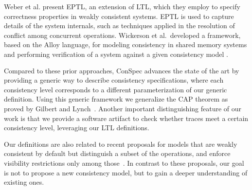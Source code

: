 \documentclass[journal, compsoc]{IEEEtran}
\begin{document}
	Weber et al. \cite{Weber2017} present EPTL, an extension of LTL,  which they employ to specify correctness properties in weakly consistent systems. EPTL is used to capture  details of the system internals, such as techniques applied in the resolution of conflict among concurrent operations. Wickerson et al.\ developed a framework, based on the Alloy language, for modeling consistency in shared memory systems and performing verification of a system against a given consistency model  \cite{Wickerson:2017:ACM:3009837.3009838}.
	
	
	Compared to these prior approaches, ConSpec advances the state of the art by providing a generic way to describe consistency specifications, where each consistency level corresponds to a different parameterization of our generic definition.  Using this generic framework we generalize the CAP theorem as proved by Gilbert and Lynch~\cite{Gilbert:2002:BCF:564585.564601}. Another important distinguishing feature of our work is that we provide a software artifact to check whether traces meet a certain consistency level, leveraging our LTL definitions. %
	
	Our definitions are also related to recent proposals for models that are weakly consistent by default but distinguish a subset of the operations, and enforce visibility restrictions only among those~\cite{Li:2012:MGS:2387880.2387906, Gotsman:2016:CIS:2837614.2837625, cheng-papoc}. In contrast to these proposals, our goal is not to propose a new consistency model, but to gain a deeper understanding of existing ones.
	
\end{document}
